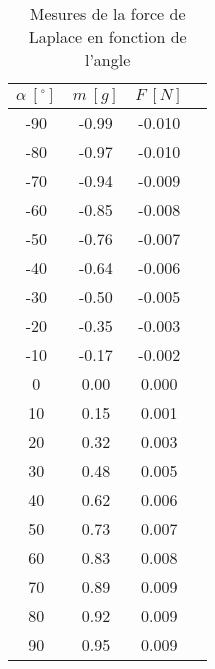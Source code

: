\documentclass[11pt]{article}
\begin{document}
    \hfill
    \begin{minipage}{.3\textwidth}
        \begin{table}[H]
            \centering
            \begin{tabular}{|c|c|c|c|}
                \hline
                \rowcolor{gray} $\alpha \ [^\circ]$ & $m \ [g]$ & $F \ [N]$ \\
                \hline
                -90 & -0.99 & -0.010 \\
                \hline
                -80 & -0.97 & -0.010 \\
                \hline
                -70 & -0.94 & -0.009 \\
                \hline
                -60 & -0.85 & -0.008 \\
                \hline
                -50 & -0.76 & -0.007 \\
                \hline
                -40 & -0.64 & -0.006 \\
                \hline
                -30 & -0.50 & -0.005 \\
                \hline
                -20 & -0.35 & -0.003 \\
                \hline
                -10 & -0.17 & -0.002 \\
                \hline
                0 & 0.00 & 0.000 \\
                \hline
                10 & 0.15 & 0.001 \\
                \hline
                20 & 0.32 & 0.003 \\
                \hline
                30 & 0.48 & 0.005 \\
                \hline
                40 & 0.62 & 0.006 \\
                \hline
                50 & 0.73 & 0.007 \\
                \hline
                60 & 0.83 & 0.008 \\
                \hline
                70 & 0.89 & 0.009 \\
                \hline
                80 & 0.92 & 0.009 \\
                \hline
                90 & 0.95 & 0.009 \\
                \hline
            \end{tabular}
            \caption{Mesures de la force de Laplace en fonction de l'angle}
            \label{tab:mesure-angle}
        \end{table}
    \end{minipage}
\end{document}
